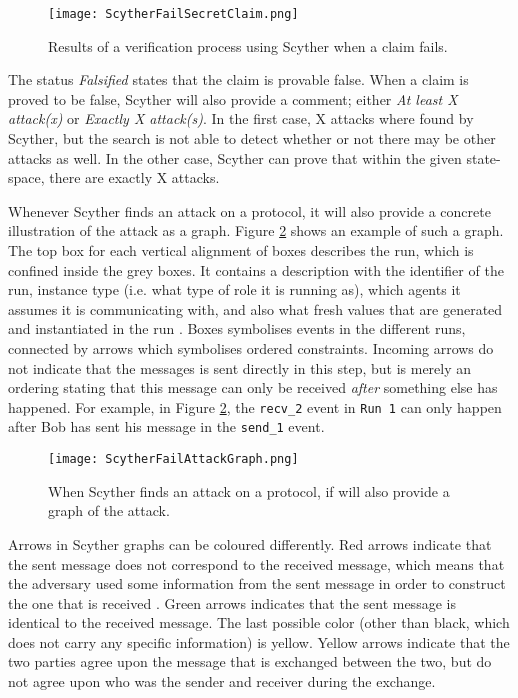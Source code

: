 \begin{figure}[h]
	\centering
	\texttt{[image: ScytherFailSecretClaim.png]}
	\caption{Results of a verification process using Scyther when a claim fails.}
	\label{fig:scyther-verify-claims-fail}
\end{figure}

The status \emph{Falsified} states that the claim is provable false. When a claim is proved to be false, Scyther will also provide a comment; either \emph{At least X attack(x)} or \emph{Exactly X attack(s)}. In the first case, X attacks where found by Scyther, but the search is not able to detect whether or not there may be other attacks as well. In the other case, Scyther can prove that within the given state-space, there are exactly X attacks.

Whenever Scyther finds an attack on a protocol, it will also provide a concrete illustration of the attack as a graph. Figure \ref{fig:scyther-graph} shows an example of such a graph. The top box for each vertical alignment of boxes describes the run, which is confined inside the grey boxes. It contains a description with the identifier of the run, instance type (i.e. what type of role it is running as), which agents it assumes it is communicating with, and also what fresh values that are generated and instantiated in the run \cite{scyther-manual}. Boxes symbolises events in the different runs, connected by arrows which symbolises ordered constraints. Incoming arrows do not indicate that the messages is sent directly in this step, but is merely an ordering stating that this message can only be received \emph{after} something else has happened. For example, in Figure \ref{fig:scyther-graph}, the \texttt{recv\_2} event in \texttt{Run 1} can only happen after Bob has sent his message in the \texttt{send\_1} event.



\begin{figure}[h]
	\centering
	\texttt{[image: ScytherFailAttackGraph.png]}
	\caption{When Scyther finds an attack on a protocol, if will also provide a graph of the attack.}
	\label{fig:scyther-graph}
\end{figure}

Arrows in Scyther graphs can be coloured differently. Red arrows indicate that the sent message does not correspond to the received message, which means that the adversary used some information from the sent message in order to construct the one that is received \cite{scyther-manual}. Green arrows indicates that the sent message is identical to the received message. The last possible color (other than black, which does not carry any specific information) is yellow. Yellow arrows indicate that the two parties agree upon the message that is exchanged between the two, but do not agree upon who was the sender and receiver during the exchange.

